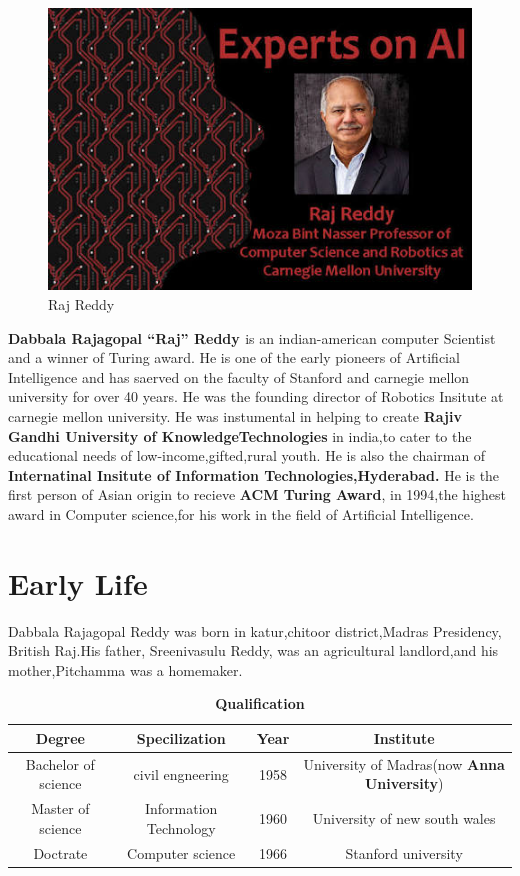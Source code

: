 \documentclass[a4paper,10pt]{article}
\begin{document}
\begin{figure}
 \includegraphics[scale=0.4]{raj.jpg}
 \caption{Raj Reddy}
\end{figure}

  \textbf{Dabbala Rajagopal ``Raj'' Reddy \cite{1}} 
  is an indian-american computer 
  Scientist and a winner of Turing award. He is one of the early 
  pioneers of Artificial Intelligence and has saerved on the faculty 
  of Stanford and carnegie mellon university for over 40 years. He 
  was the founding director of Robotics Insitute at carnegie mellon university.
  He was instumental in helping to create {\bf Rajiv Gandhi University of 
  KnowledgeTechnologies} in india,to cater to the educational needs of 
  low-income,gifted,rural youth. He is also the chairman of 
  {\bf Internatinal Insitute of Information Technologies,Hyderabad.}
  He is the first person of Asian origin to recieve {\bf ACM Turing Award}, in 
  1994,the highest award in Computer science,for his work in the field of 
  Artificial Intelligence.
  
  
\section{Early Life}  
  Dabbala Rajagopal Reddy was born in katur,chitoor district,Madras Presidency,
  British Raj.His father, Sreenivasulu Reddy, was an agricultural landlord,and 
  his mother,Pitchamma was a  homemaker.                   
  
\begin{table}[!hbt]
 \centering
 \caption{\bf Qualification}
  \begin{tabular}{|c|c|c|c|}
    \hline
    {\bf Degree} & {\bf Specilization} & {\bf Year} & {\bf Institute}\\
    \hline
    Bachelor of science & civil engneering & 1958 & 
    \begin{minipage}{0.295\textwidth} 
      University of Madras(now {\bf Anna University})
    \end{minipage}\\
    \hline
    Master of science & Information Technology & 1960 & University of new south wales\\
    \hline
    Doctrate & Computer science & 1966 & Stanford university\\
    \hline
  \end{tabular}
\end{table}
\end{document}
